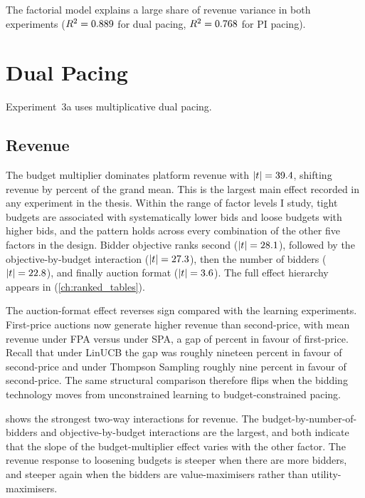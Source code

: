 The factorial model explains a large share of revenue variance in both experiments ($R^2 = 0.889$ for dual pacing, $R^2 = 0.768$ for PI pacing).

\section{Dual Pacing}
\label{sec:exp3a_results}

Experiment~3a uses multiplicative dual pacing.

\subsection{Revenue}

The budget multiplier dominates platform revenue with $|t| = 39.4$, shifting revenue by \ExpThreeARevTopPctEffect{} percent of the grand mean. This is the largest main effect recorded in any experiment in the thesis. Within the range of factor levels I study, tight budgets are associated with systematically lower bids and loose budgets with higher bids, and the pattern holds across every combination of the other five factors in the design. Bidder objective ranks second ($|t| = 28.1$), followed by the objective-by-budget interaction ($|t| = 27.3$), then the number of bidders ($|t| = 22.8$), and finally auction format ($|t| = 3.6$). The full effect hierarchy appears in  (\cref{ch:ranked_tables}).

The auction-format effect reverses sign compared with the learning experiments. First-price auctions now generate higher revenue than second-price, with mean revenue \ExpThreeARevMeanFPA{} under FPA versus \ExpThreeARevMeanSPA{} under SPA, a gap of \ExpThreeARevGapPct{} percent in favour of first-price. Recall that under LinUCB the gap was roughly nineteen percent in favour of second-price and under Thompson Sampling roughly nine percent in favour of second-price. The same structural comparison therefore flips when the bidding technology moves from unconstrained learning to budget-constrained pacing.

 shows the strongest two-way interactions for revenue. The budget-by-number-of-bidders and objective-by-budget interactions are the largest, and both indicate that the slope of the budget-multiplier effect varies with the other factor. The revenue response to loosening budgets is steeper when there are more bidders, and steeper again when the bidders are value-maximisers rather than utility-maximisers.

